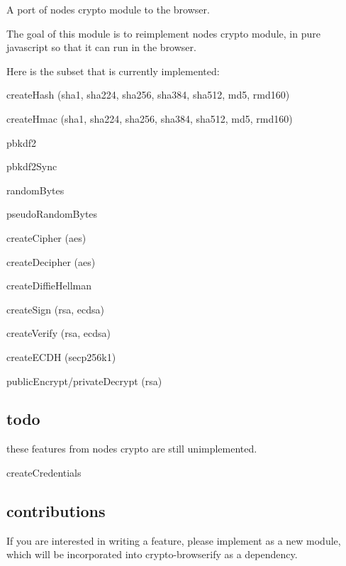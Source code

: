 A port of node\textquotesingle{}s {\ttfamily crypto} module to the browser.

\href{https://travis-ci.org/crypto-browserify/crypto-browserify}{\tt } \href{https://github.com/feross/standard}{\tt } \href{https://saucelabs.com/u/crypto-browserify}{\tt }

The goal of this module is to reimplement node\textquotesingle{}s crypto module, in pure javascript so that it can run in the browser.

Here is the subset that is currently implemented\+:


\begin{DoxyItemize}
\item create\+Hash (sha1, sha224, sha256, sha384, sha512, md5, rmd160)
\item create\+Hmac (sha1, sha224, sha256, sha384, sha512, md5, rmd160)
\item pbkdf2
\item pbkdf2\+Sync
\item random\+Bytes
\item pseudo\+Random\+Bytes
\item create\+Cipher (aes)
\item create\+Decipher (aes)
\item create\+Diffie\+Hellman
\item create\+Sign (rsa, ecdsa)
\item create\+Verify (rsa, ecdsa)
\item create\+E\+C\+DH (secp256k1)
\item public\+Encrypt/private\+Decrypt (rsa)
\end{DoxyItemize}

\subsection*{todo}

these features from node\textquotesingle{}s {\ttfamily crypto} are still unimplemented.


\begin{DoxyItemize}
\item create\+Credentials
\end{DoxyItemize}

\subsection*{contributions}

If you are interested in writing a feature, please implement as a new module, which will be incorporated into crypto-\/browserify as a dependency.

